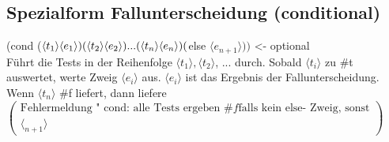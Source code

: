 \documentclass[a4paper,12pt]{article}
\begin{document}
\subsection{Spezialform Fallunterscheidung (conditional)}

(cond ($\langle t_1 \rangle \langle e_1 \rangle)\\
(\langle t_2 \rangle \langle e_2 \rangle)\\
...\\
(\langle t_n \rangle \langle e_n \rangle)\\
($else  $\langle e_{n+1} \rangle))$ <- optional
\\
Führt die Tests in der Reihenfolge $\langle t_1 \rangle, \langle t_2 \rangle$, ... durch. Sobald $\langle t_i\rangle$ zu \#t auswertet, werte Zweig $\langle e_i\rangle$ aus. $\langle e_i\rangle $ ist das Ergebnis der Fallunterscheidung. Wenn $\langle t_n\rangle$ \#f liefert, dann liefere \\
$\left(\begin{array}{l}\text{Fehlermeldung " cond: alle Tests ergeben }\#f \text{falls kein else- Zweig, sonst}\\ \langle_{n+1}\rangle \end{array}\right)$
\end{document}
